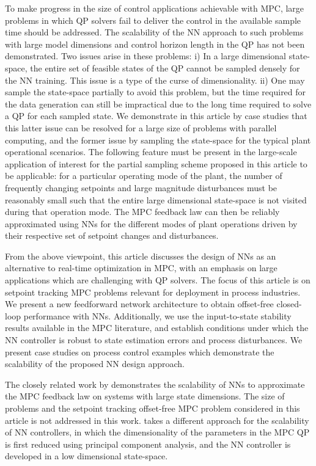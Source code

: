 \documentclass[preprint,5p, twocolumn, authoryear]{elsarticle}
\begin{document}
To make progress in the size of control applications 
achievable with MPC, large problems
in which QP solvers fail to deliver the 
control in the available sample time should be addressed.
The scalability of the NN approach
to such problems with large model dimensions and 
control horizon length in the QP
has not been demonstrated. Two issues arise 
in these problems:
i) In a large dimensional state-space,   
the entire set of feasible states of the QP cannot be sampled  
densely for the NN training. This issue is 
a type of the curse of dimensionality.
ii) One may sample the state-space partially
to avoid this problem, but the time required for the 
data generation can still be impractical
due to the long time required to solve a QP 
for each sampled state. 
We demonstrate in this article by case studies that
this latter issue can be resolved for a large size 
of problems with parallel 
computing, and the former issue by sampling the 
state-space for the typical plant operational scenarios.
The following feature must be present in the large-scale
application of interest for the partial sampling scheme 
proposed in this article to be applicable:
for a particular operating mode of the plant, 
the number of frequently changing setpoints
and large magnitude disturbances 
must be reasonably small 
such that the entire large
dimensional state-space is not visited during that
operation mode. 
The MPC feedback law 
can then be reliably approximated using NNs
for the different modes of plant operations driven by  
their respective set
of setpoint changes and disturbances.

From the above viewpoint, 
this article discusses the design of NNs
as an alternative to real-time optimization in MPC, 
with an emphasis on large applications which 
are challenging with QP solvers. 
The focus of this article is on setpoint tracking 
MPC problems relevant for deployment in process industries.
We present a new feedforward network architecture to obtain
offset-free closed-loop performance with NNs.
Additionally, we use the input-to-state
stability results \citep*{sontag:wang:1995}
available in the MPC literature, and establish
conditions under which the NN controller 
is robust to state estimation errors and process 
disturbances. We present case studies 
on process control examples which
demonstrate the scalability of the proposed NN design 
approach.

The closely related work by \cite*{chen:wang:atanasov:kumar:morari:2019}
demonstrates the scalability of NNs 
to approximate the MPC feedback law on systems with 
large state dimensions. The 
size of problems and the setpoint 
tracking offset-free MPC problem   
considered in this 
article is not addressed in this work. 
\cite*{drgona:picard:kvasnica:helsen:2018}
takes a different approach for the scalability
of NN controllers, in which 
the dimensionality of the parameters in the MPC QP is first 
reduced using principal component analysis, and the 
NN controller 
is developed in a low dimensional state-space.
\end{document}
